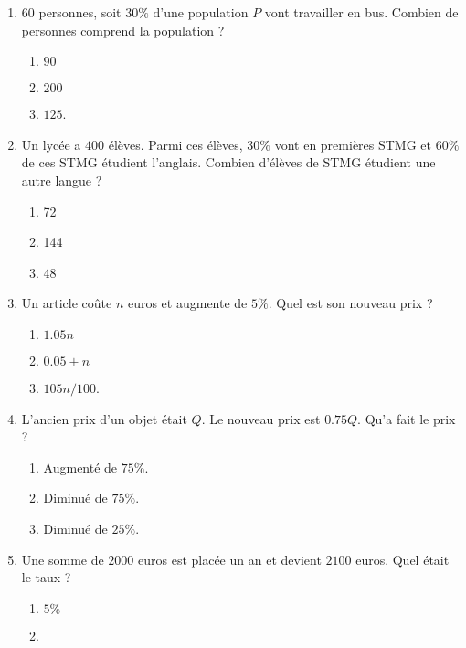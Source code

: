 \begin{exercice}
\begin{enumerate}
    \item
        \( 60\) personnes, soit \( 30\%\) d'une population \( P\) vont travailler en bus. Combien de personnes comprend la population ?
        \begin{enumerate}
            \item
                $90$
            \item
                \( 200\)
            \item
                \( 125\).
        \end{enumerate}
    \item
        Un lycée a \( 400\) élèves. Parmi ces élèves, \( 30\%\) vont en premières STMG et \( 60\%\) de ces STMG étudient l'anglais. Combien d'élèves de STMG étudient une autre langue ?
        \begin{enumerate}
            \item
                72
            \item
                144
            \item
                48
        \end{enumerate}
    \item
        Un article coûte \( n\) euros et augmente de \( 5\%\). Quel est son nouveau prix ?
        \begin{enumerate}
            \item
                \( 1.05n\)
            \item
                \( 0.05+n\)
            \item
                \( 105n/100\).
        \end{enumerate}
    \item
        L'ancien prix d'un objet était \( Q\). Le nouveau prix est \( 0.75Q\). Qu'a fait le prix ?
        \begin{enumerate}
            \item
                Augmenté de \( 75\%\).
            \item
                Diminué de \( 75\%\).
            \item
                Diminué de \( 25\%\).
        \end{enumerate}
    \item
        Une somme de \( 2000\) euros est placée un an et devient \( 2100\) euros. Quel était le taux ?
        \begin{enumerate}
            \item
                \( 5\%\)
            \item

\end{enumerate}
\end{enumerate}
\end{exercice}
